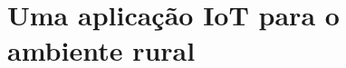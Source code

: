\documentclass[
    hidelinks,
	12pt,				%
	openany,
	oneside, 
	a4paper,			%
	english,			%
	french,				%
	spanish,			%
	brazil				%
	]{abntex2}
\begin{document}








\section{Uma aplicação IoT para o ambiente rural} \label{modeloaplicacao}
\end{document}
